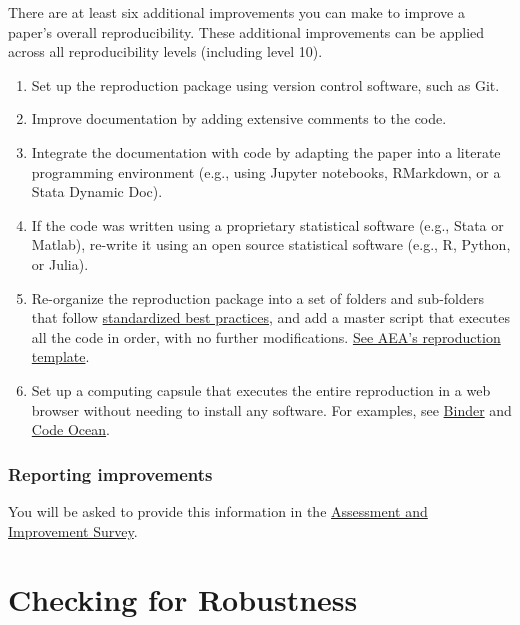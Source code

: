 \documentclass[]{book}
\providecommand{\tightlist}{%
  \setlength{\itemsep}{0pt}\setlength{\parskip}{0pt}}
\begin{document}
There are at least six additional improvements you can make to improve a paper's overall reproducibility. These additional improvements can be applied across all reproducibility levels (including level 10).

\begin{enumerate}
\def\labelenumi{\arabic{enumi}.}
\tightlist
\item
  Set up the reproduction package using version control software, such as Git.
\item
  Improve documentation by adding extensive comments to the code.
\item
  Integrate the documentation with code by adapting the paper into a literate programming environment (e.g., using Jupyter notebooks, RMarkdown, or a Stata Dynamic Doc).
\item
  If the code was written using a proprietary statistical software (e.g., Stata or Matlab), re-write it using an open source statistical software (e.g., R, Python, or Julia).
\item
  Re-organize the reproduction package into a set of folders and sub-folders that follow \href{https://www.projecttier.org/tier-protocol/specifications/\#overview-of-the-documentation}{standardized best practices}, and add a master script that executes all the code in order, with no further modifications. \href{https://github.com/AEADataEditor/replication-template}{See AEA's reproduction template}.\\
\item
  Set up a computing capsule that executes the entire reproduction in a web browser without needing to install any software. For examples, see \href{https://mybinder.org/}{Binder} and \href{https://codeocean.com/}{Code Ocean}.
\end{enumerate}

\hypertarget{reporting-improvements}{%
\subsection{Reporting improvements}\label{reporting-improvements}}

You will be asked to provide this information in the \href{ADD\%20LINK}{Assessment and Improvement Survey}.

\hypertarget{robust}{%
\chapter{Checking for Robustness}\label{robust}}
\end{document}
